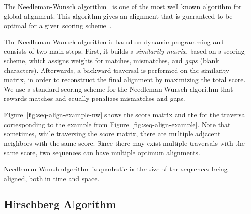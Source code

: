 The Needleman-Wunsch algorithm~\cite{needleman70} is one of the most well known algorithm for global alignment.
This algorithm gives an alignment that is guaranteed to be optimal for a given scoring scheme~\cite{higgins89}.

The Needleman-Wunsch algorithm is based on dynamic programming and consists of two main steps. First, it builds a \textit{similarity matrix}, based on a scoring scheme, which assigns weights
for matches, mismatches, and \textit{gaps} (blank characters). Afterwards, a backward traversal is performed on the similarity matrix, in
order to reconstruct the final alignment by maximizing the total score. We use a standard scoring scheme for the Needleman-Wunsch algorithm
that rewards matches and equally penalizes mismatches and gaps.

Figure~\ref{fig:seq-align-example-nw} shows the score matrix and the for the traversal corresponding to the example from Figure~\ref{fig:seq-align-example}. 
Note that sometimes, while traversing the score matrix, there are multiple adjacent neighbors with the same score.
Since there may exist multiple traversals with the same score, two sequences can have multiple optimum alignments.

Needleman-Wunsh algorithm is quadratic in the size of the sequences being aligned, both in time and space.

\subsection{Hirschberg Algorithm}

